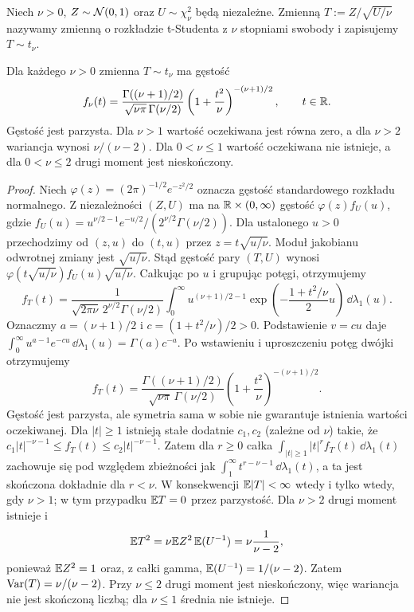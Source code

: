\begin{definicja}
Niech $\nu>0$, $Z\sim\mathcal{N}(0,1)$ oraz
$U\sim\chi^2_\nu$ będą niezależne. Zmienną
$T:=Z/\sqrt{U/\nu}$ nazywamy zmienną o rozkładzie
t-Studenta z $\nu$ stopniami swobody i zapisujemy $T\sim t_\nu$.
\end{definicja}

\begin{twierdzenie}
Dla każdego $\nu>0$ zmienna $T\sim t_\nu$ ma gęstość
\begin{equation}\label{eq:student}
f_\nu(t)=
\frac{\Gamma((\nu+1)/2)}{\sqrt{\nu\pi}\,\Gamma(\nu/2)}
\left(1+\frac{t^2}{\nu}\right)^{-(\nu+1)/2},
\qquad t\in\mathbb{R}.
\end{equation}
Gęstość jest parzysta. Dla $\nu>1$ wartość oczekiwana
jest równa zero, a dla $\nu>2$ wariancja wynosi $\nu/(\nu-2)$.
Dla $0<\nu\leq1$ wartość oczekiwana nie istnieje,
a dla $0<\nu\leq2$ drugi moment jest nieskończony.
\end{twierdzenie}
\begin{proof}
Niech $\varphi(z)=(2\pi)^{-1/2}e^{-z^2/2}$ oznacza
gęstość standardowego rozkładu normalnego.
Z niezależności $(Z,U)$ ma na $\mathbb{R}\times(0,\infty)$
gęstość $\varphi(z)f_U(u)$, gdzie
$f_U(u)=u^{\nu/2-1}e^{-u/2}/(2^{\nu/2}\Gamma(\nu/2))$.
Dla ustalonego $u>0$ przechodzimy od
$(z,u)$ do $(t,u)$ przez $z=t\sqrt{u/\nu}$.
Moduł jakobianu odwrotnej zmiany jest
$\sqrt{u/\nu}$. Stąd gęstość pary $(T,U)$
wynosi $\varphi(t\sqrt{u/\nu})f_U(u)\sqrt{u/\nu}$.
Całkując po $u$ i grupując potęgi, otrzymujemy
\[
f_T(t)=\frac1{\sqrt{2\pi\nu}\,2^{\nu/2}\Gamma(\nu/2)}
\int_0^\infty u^{(\nu+1)/2-1}
\exp\!\left(-\frac{1+t^2/\nu}{2}u\right)
\,\dd\lambda_1(u).
\]
Oznaczmy $a=(\nu+1)/2$ i $c=(1+t^2/\nu)/2>0$.
Podstawienie $v=cu$ daje
$\int_0^\infty u^{a-1}e^{-cu}\,\dd\lambda_1(u)
=\Gamma(a)c^{-a}$.
Po wstawieniu i uproszczeniu potęg dwójki
otrzymujemy
\[
f_T(t)=\frac{\Gamma((\nu+1)/2)}
{\sqrt{\nu\pi}\,\Gamma(\nu/2)}
\left(1+\frac{t^2}{\nu}\right)^{-(\nu+1)/2}.
\]
Gęstość jest parzysta, ale symetria sama w sobie
nie gwarantuje istnienia wartości oczekiwanej.
Dla $|t|\geq1$ istnieją stałe dodatnie $c_1,c_2$
(zależne od $\nu$) takie, że
$c_1|t|^{-\nu-1}\leq f_T(t)
\leq c_2|t|^{-\nu-1}$. Zatem dla $r\geq0$
całka $\int_{|t|\geq1}|t|^rf_T(t)\,\dd\lambda_1(t)$
zachowuje się pod względem zbieżności jak
$\int_1^\infty t^{r-\nu-1}\,\dd\lambda_1(t)$,
a ta jest skończona dokładnie dla $r<\nu$.
W konsekwencji $\mathbb{E}|T|<\infty$ wtedy i tylko wtedy,
gdy $\nu>1$; w tym przypadku $\mathbb{E} T=0$ przez parzystość.
Dla $\nu>2$ drugi moment istnieje i
\[
\mathbb{E} T^2=\nu\mathbb{E} Z^2\,\mathbb{E}(U^{-1})
=\nu\frac{1}{\nu-2},
\]
ponieważ $\mathbb{E} Z^2=1$ oraz, z całki gamma,
$\mathbb{E}(U^{-1})=1/(\nu-2)$. Zatem
$\operatorname{Var}(T)=\nu/(\nu-2)$. Przy $\nu\leq2$ drugi
moment jest nieskończony, więc wariancja nie jest
skończoną liczbą; dla $\nu\leq1$ średnia nie istnieje.
\end{proof}

